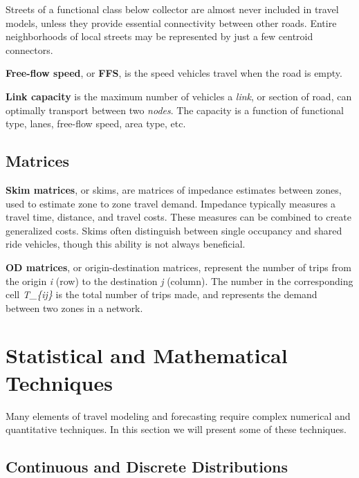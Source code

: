 \documentclass[
]{book}
\begin{document}
Streets of a functional class below collector are almost never included in
travel models, unless they provide essential connectivity between other roads.
Entire neighborhoods of local streets may be represented by just a few centroid
connectors.

\textbf{Free-flow speed}, or \textbf{FFS}, is the speed vehicles travel when the road
is empty.

\textbf{Link capacity} is the maximum number of vehicles a \emph{link}, or section of
road, can optimally transport between two \emph{nodes}. The capacity is a function
of functional type, lanes, free-flow speed, area type, etc.

\hypertarget{matrices}{%
\subsection{Matrices}\label{matrices}}

\textbf{Skim matrices}, or skims, are matrices of impedance estimates between zones,
used to estimate zone to zone travel demand. Impedance typically measures a
travel time, distance, and travel costs. These measures can be combined to
create generalized costs. Skims often distinguish between single occupancy and
shared ride vehicles, though this ability is not always beneficial.

\textbf{OD matrices}, or origin-destination matrices, represent the number of trips
from the origin \emph{i} (row) to the destination \emph{j} (column). The number in the
corresponding cell \emph{T\_\{ij\}} is the total number of trips made, and represents
the demand between two zones in a network.

\hypertarget{statistical-and-mathematical-techniques}{%
\section{Statistical and Mathematical Techniques}\label{statistical-and-mathematical-techniques}}

Many elements of travel modeling and forecasting require complex numerical and
quantitative techniques. In this section we will present some of these techniques.

\hypertarget{continuous-and-discrete-distributions}{%
\subsection{Continuous and Discrete Distributions}\label{continuous-and-discrete-distributions}}
\end{document}
